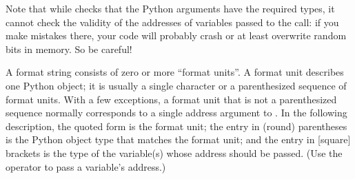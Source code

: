 \documentclass{manual}
\begin{document}
Note that while  checks that the Python
arguments have the required types, it cannot check the validity of the
addresses of \C{} variables passed to the call: if you make mistakes
there, your code will probably crash or at least overwrite random bits
in memory.  So be careful!

A format string consists of zero or more ``format units''.  A format
unit describes one Python object; it is usually a single character or
a parenthesized sequence of format units.  With a few exceptions, a
format unit that is not a parenthesized sequence normally corresponds
to a single address argument to .  In the
following description, the quoted form is the format unit; the entry
in (round) parentheses is the Python object type that matches the
format unit; and the entry in [square] brackets is the type of the \C{}
variable(s) whose address should be passed.  (Use the \samp{\&}
operator to pass a variable's address.)
\end{document}
